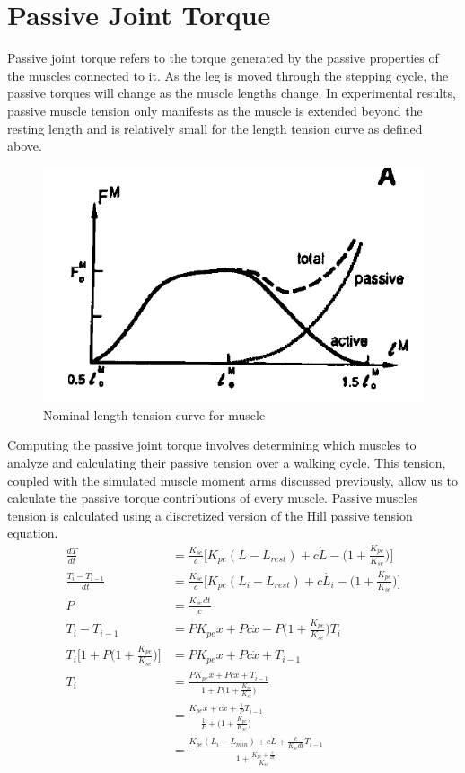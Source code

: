 \documentclass[runningheads,a4paper]{llncs}
\begin{document}
	\section{Passive Joint Torque}
	Passive joint torque refers  to the torque generated by the passive properties of the muscles connected to it. As the leg is moved through the stepping cycle, the passive torques will change as the muscle lengths change. In experimental results, passive muscle tension only manifests as the muscle is extended beyond the resting length and is relatively small for the length tension curve as defined above. \par
		\begin{figure}
			\centering
			\includegraphics[width=.7\textwidth]{lwidth3.PNG}
			\caption{Nominal length-tension curve for muscle}
			\label{fig:passX}
		\end{figure}
	Computing the passive joint torque involves determining which muscles to analyze and calculating their passive tension over a walking cycle. This tension, coupled with the simulated muscle moment arms discussed previously, allow us to calculate the passive torque contributions of every muscle. Passive muscles tension is calculated using a discretized version of the Hill passive tension equation.
		\begin{align*}
			\frac{dT}{dt} &= \frac{K_{se}}{c}\bigg[K_{pe}(L-L_{rest})+c \dot{L}-\big(1+\frac{K_{pe}}{K_{se}}\big)\bigg] \\
			\frac{T_{i}-T_{i-1}}{dt} &= \frac{K_{se}}{c}\bigg[K_{pe}(L_{i}-L_{rest})+c \dot{L_{i}}-\big(1+\frac{K_{pe}}{K_{se}}\big)\bigg] \\
			P &= \frac{K_{se} dt}{c} \\
			T_{i}-T_{i-1} &= P K_{pe}x+Pc\dot{x} -P\big(1+\frac{K_{pe}}{K_{se}}\big)T_{i} \\
			T_{i}\big[1+P\big(1+\frac{K_{pe}}{K_{se}}\big)\big] &= P K_{pe}x+Pc\dot{x}+T_{i-1}\\
			T_{i} &= \frac{P K_{pe}x+Pc\dot{x}+T_{i-1}}{1+P\big(1+\frac{K_{pe}}{K_{se}}\big)} \\
			&= \frac{K_{pe}x+c\dot{x}+\frac{1}{P}T_{i-1}}{\frac{1}{P}+\big(1+\frac{K_{pe}}{K_{se}}\big)} \\
			&= \frac{K_{pe}(L_i-L_{min})+c\dot{L}+\frac{c}{K_{se}dt}T_{i-1}}{1+\frac{K_{pe}+\frac{c}{dt}}{K_{se}}}
		\end{align*}
\end{document}
